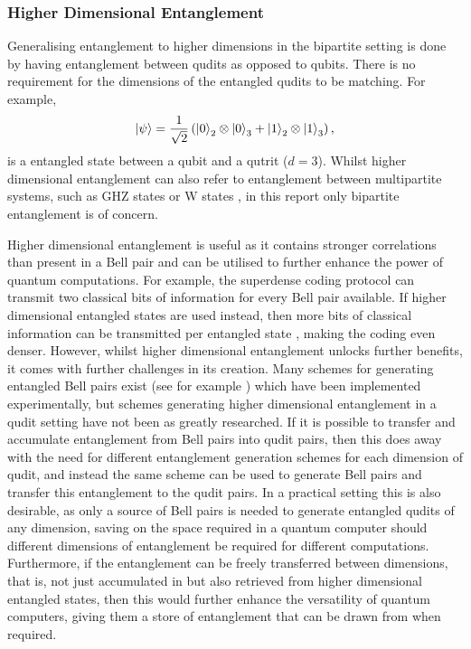 \subsubsection{Higher Dimensional Entanglement}
Generalising entanglement to higher dimensions in the bipartite setting is done by having entanglement between qudits as opposed to qubits.
There is no requirement for the dimensions of the entangled qudits to be matching.
For example,
\begin{equation}
    \ket{\psi} = \frac{1}{\sqrt{2}}\left(\ket{0}_2\otimes\ket{0}_3 + \ket{1}_2\otimes\ket{1}_3\right),
\end{equation}
is a entangled state between a qubit and a qutrit ($d=3$).
Whilst higher dimensional entanglement can also refer to entanglement between multipartite systems, such as GHZ states or W states \cite{bengtsson2016brief}, in this report only bipartite entanglement is of concern.

Higher dimensional entanglement is useful as it contains stronger correlations than present in a Bell pair and can be utilised to further enhance the power of quantum computations.
For example, the superdense coding protocol can transmit two classical bits of information for every Bell pair available.
If higher dimensional entangled states are used instead, then more bits of classical information can be transmitted per entangled state \cite{Liu_2002}, making the coding even denser.
However, whilst higher dimensional entanglement unlocks further benefits, it comes with further challenges in its creation.
Many schemes for generating entangled Bell pairs exist (see for example \cite{Browne_2003, Wei_2006, Messina_2002}) which have been implemented experimentally, but schemes generating higher dimensional entanglement in a qudit setting have not been as greatly researched.
If it is possible to transfer and accumulate entanglement from Bell pairs into qudit pairs, then this does away with the need for different entanglement generation schemes for each dimension of qudit, and instead the same scheme can be used to generate Bell pairs and transfer this entanglement to the qudit pairs.
In a practical setting this is also desirable, as only a source of Bell pairs is needed to generate entangled qudits of any dimension, saving on the space required in a quantum computer should different dimensions of entanglement be required for different computations.
Furthermore, if the entanglement can be freely transferred between dimensions, that is, not just accumulated in but also retrieved from higher dimensional entangled states, then this would further enhance the versatility of quantum computers, giving them a store of entanglement that can be drawn from when required.


